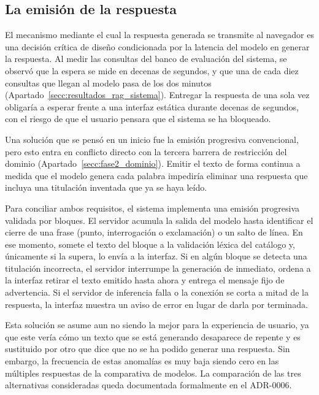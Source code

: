 \subsection[La emisión de la respuesta]{La emisión de la respuesta}
\label{secc:fase3_emision}

El mecanismo mediante el cual la respuesta generada se transmite al navegador es una decisión crítica de diseño condicionada por la latencia del modelo en generar la respuesta. Al medir las consultas del banco de evaluación del sistema, se observó que la espera se mide en decenas de segundos, y que una de cada diez consultas que llegan al modelo pasa de los dos minutos (Apartado~\ref{secc:resultados_rag_sistema}). Entregar la respuesta de una sola vez obligaría a esperar frente a una interfaz estática durante decenas de segundos, con el riesgo de que el usuario pensara que el sistema se ha bloqueado.

Una solución que se pensó en un inicio fue la emisión progresiva convencional, pero esto entra en conflicto directo con la tercera barrera de restricción del dominio (Apartado~\ref{secc:fase2_dominio}). Emitir el texto de forma continua a medida que el modelo genera cada palabra impediría eliminar una respuesta que incluya una titulación inventada que ya se haya leído.

Para conciliar ambos requisitos, el sistema implementa una emisión progresiva validada por bloques. El servidor acumula la salida del modelo hasta identificar el cierre de una frase (punto, interrogación o exclamación) o un salto de línea. En ese momento, somete el texto del bloque a la validación léxica del catálogo y, únicamente si la supera, lo envía a la interfaz. Si en algún bloque se detecta una titulación incorrecta, el servidor interrumpe la generación de inmediato, ordena a la interfaz retirar el texto emitido hasta ahora y entrega el mensaje fijo de advertencia. Si el servidor de inferencia falla o la conexión se corta a mitad de la respuesta, la interfaz muestra un aviso de error en lugar de darla por terminada.

Esta solución se asume aun no siendo la mejor para la experiencia de usuario, ya que este vería cómo un texto que se está generando desaparece de repente y es sustituido por otro que dice que no se ha podido generar una respuesta. Sin embargo, la frecuencia de estas anomalías es muy baja siendo cero en las múltiples respuestas de la comparativa de modelos. La comparación de las tres alternativas consideradas queda documentada formalmente en el ADR-0006\cite{repo_tfg}.


